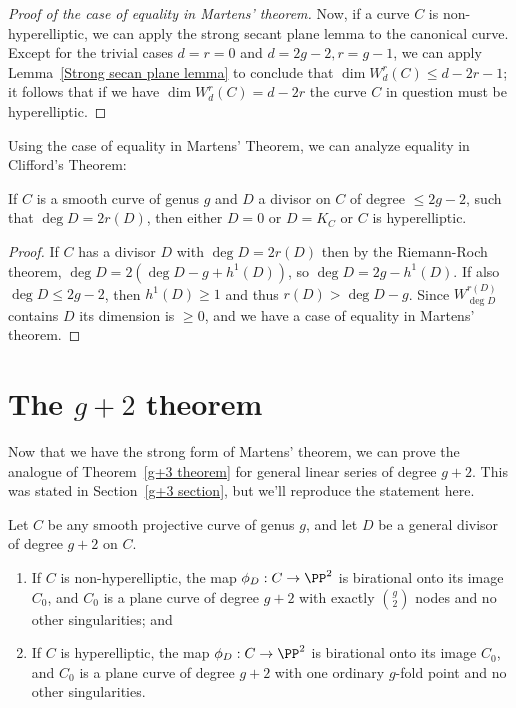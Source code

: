 \begin{proof}[Proof of the case of equality in Martens' theorem]
 Now, if a curve $C$ is non-hyperelliptic, we can apply the strong secant plane lemma to the canonical curve. Except for the trivial cases $d=r=0$ and $d=2g-2, r=g-1$,
 we can apply Lemma~\ref{Strong secan plane lemma} to conclude that $\dim W^r_d(C) \leq d-2r-1$; it follows that if we have $\dim W^r_d(C) = d-2r$ the curve $C$ in question must be hyperelliptic.
\end{proof}

Using the case of equality in Martens' Theorem, we can analyze equality in 
Clifford's Theorem:

\begin{corollary}\label{equality in Clifford from Martens}
If $C$ is a smooth curve of genus $g$ and $D$ a divisor on $C$ of degree $\leq 2g-2$,
such that $\deg D = 2r(D)$, then either $D =0$ or $D=K_C$ or $C$ is hyperelliptic.
\end{corollary}

\begin{proof}
If $C$ has a divisor $D$ with $\deg D =2 r(D)$ then by the Riemann-Roch theorem,  $\deg D  = 2(\deg D-g+h^1(D))$, 
so $\deg D = 2g-h^1(D)$. If also $\deg D\leq 2g-2$, then $h^1(D) \geq 1$
and thus $r(D) >\deg D-g$. Since $W^{r(D)}_{\deg D}$ contains $D$ its dimension
is $\geq 0$, and we have a case of equality in Martens' theorem.
\end{proof}

\section{The $g+2$ theorem}\label{g+2 section}

Now that we have the strong form of Martens' theorem, we can prove the analogue of Theorem~\ref{g+3 theorem} for general linear series of degree $g+2$. This was stated in Section~\ref{g+3 section}, but we'll reproduce the statement here.

\begin{theorem}
Let $C$ be any smooth projective curve of genus $g$, and let $D$ be a general divisor of degree $g+2$ on $C$. 
\begin{enumerate}
\item If $C$ is non-hyperelliptic, the map $\phi_D : C \to \PP^2$ is birational onto its image $C_0$, and $C_0$ is a plane curve of degree $g+2$ with exactly $\binom{g}{2}$ nodes and no other singularities; and
\item If $C$ is hyperelliptic, the map $\phi_D : C \to \PP^2$ is birational onto its image $C_0$, and $C_0$ is a plane curve of degree $g+2$ with one ordinary $g$-fold point and no other singularities.
\end{enumerate}
\end{theorem}

